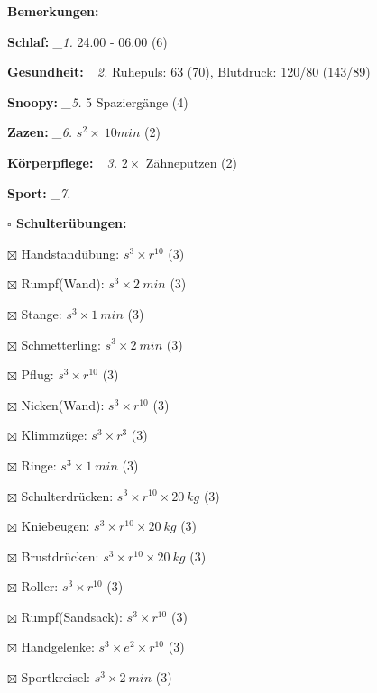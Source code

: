 \documentclass[10pt,a4paper]{article}
\newcommand\prop[1] {{\color {alizarin} {\bf #1}}}             %
\newcommand\mand[1] {{\color {burntorange} {\bf #1}}}          %
\newcommand\topspace{\vskip -15pt \hskip 20pt}
\newcommand\n[1] { {\sl #1.} \hskip 5pt }
\begin{document}
\begin{mdframed}[style=daystyle]
  \begin{labeling}{{\mand {Bemerkungen:}}}
    \setlength\itemsep{-3pt}
  \item[{\mand {Schlaf:}}]        \n{\_1} 24.00 - 06.00 (6)
  \item[{\mand {Gesundheit:}}]    \n{\_2} Ruhepuls: 63 (70), Blutdruck: 120/80 (143/89)
  \item[{\mand {Snoopy:}}]        \n{\_5} 5 Spaziergänge (4)
  \item[{\mand {Zazen:}}]         \n{\_6} $s^2 \times\ 10 min$ (2)
  \item[{\mand {Körperpflege:}}]  \n{\_3} $2 \times$ Zähneputzen (2)
  \item[{\mand {Sport:}}]         \n{\_7}
    \topspace
    \begin{minipage}{0.75\textwidth}  
      \begin{labeling}{\prop {$\square$ {Schulterübungen:}}} 
        \setlength\itemsep{-3pt}
      \item[$\boxtimes$ Handstandübung:]  $s^3 \times r^{10}$ (3)
      \item[$\boxtimes$ Rumpf(Wand):]     $s^3 \times 2\ min$ (3)
      \item[$\boxtimes$ Stange:]          $s^3 \times 1\ min$ (3)
      \item[$\boxtimes$ Schmetterling:]   $s^3 \times 2\ min$ (3)
      \item[$\boxtimes$ Pflug:]           $s^3 \times r^{10}$ (3)
      \item[$\boxtimes$ Nicken(Wand):]    $s^3 \times r^{10}$ (3)
      \item[$\boxtimes$ Klimmzüge:]       $s^3 \times r^3$ (3)
      \item[$\boxtimes$ Ringe:]           $s^3 \times 1\ min$ (3)
      \item[$\boxtimes$ Schulterdrücken:] $s^3 \times r^{10} \times 20\ kg$ (3)
      \item[$\boxtimes$ Kniebeugen:]      $s^3 \times r^{10} \times 20\ kg$ (3)
      \item[$\boxtimes$ Brustdrücken:]    $s^3 \times r^{10} \times 20\ kg$ (3)
      \item[$\boxtimes$ Roller:]          $s^3 \times r^{10}$ (3)
      \item[$\boxtimes$ Rumpf(Sandsack):] $s^3 \times r^{10}$ (3)
      \item[$\boxtimes$ Handgelenke:]     $s^3 \times e^2 \times r^{10}$ (3)
      \item[$\boxtimes$ Sportkreisel:]    $s^3 \times 2\ min$ (3)

\end{labeling}
\end{minipage}
\end{labeling}
\end{mdframed}
\end{document}
